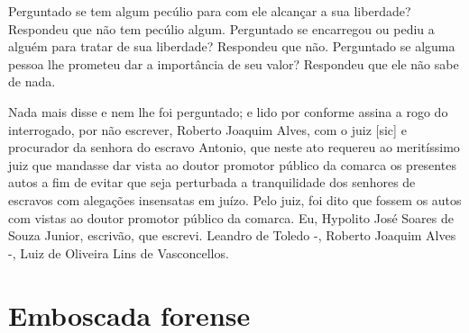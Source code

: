 Perguntado se tem algum pecúlio para com ele alcançar a sua liberdade?
Respondeu que não tem pecúlio algum. Perguntado se encarregou ou pediu a
alguém para tratar de sua liberdade? Respondeu que não. Perguntado se
alguma pessoa lhe prometeu dar a importância de seu valor? Respondeu que
ele não sabe de nada.

Nada mais disse e nem lhe foi perguntado; e lido por conforme assina a
rogo do interrogado, por não escrever, Roberto Joaquim Alves, com o juiz
{[}sic{]} e procurador da senhora do escravo Antonio, que neste ato
requereu ao meritíssimo juiz que mandasse dar vista ao doutor promotor
público da comarca os presentes autos a fim de evitar que seja
perturbada a tranquilidade dos senhores de escravos com alegações
insensatas em juízo. Pelo juiz, foi dito que fossem os autos com vistas
ao doutor promotor público da comarca. Eu, Hypolito José Soares de Souza
Junior, escrivão, que escrevi. Leandro de Toledo -, Roberto Joaquim
Alves -, Luiz de Oliveira Lins de Vasconcellos.

\part{Emboscada forense}

